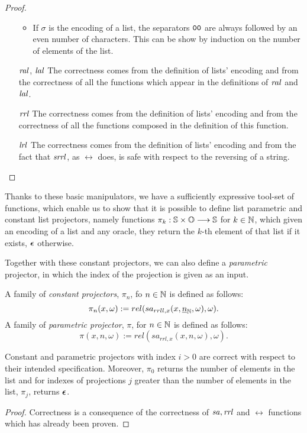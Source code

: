 \begin{proof}
\begin{itemize}
\begin{itemize}
        \item If $\sigma$ is the encoding of a list, the separators
        $\mathtt{0}\mathtt{0}$ are always followed by an even number of characters.
        This can be show by induction on the number of elements of the list.
      \end{itemize}
      \item[$\mathit{ral}$, $\mathit{lal}$] The correctness comes from the definition of
      lists' encoding and from the correctness of all the functions which
      appear in the definitions of $\mathit{ral}$ and $\mathit{lal}$.
      \item[$\mathit{rrl}$] The correctness comes from the definition of
      lists' encoding and from the correctness of all the functions composed
      in the definition of this function.
      \item[$\mathit{lrl}$] The correctness comes from the definition of
      lists' encoding and from the fact that $\mathit{srrl}$, as $\rel$ does, is
      safe with respect to the reversing of a string.
    \end{itemize}
  \end{proof}

  Thanks to these basic manipulators, we have a sufficiently expressive
  tool-set of functions, which enable us to show that it is possible to
  define list parametric and constant list projectors, namely functions
  $\pi_k: \mathbb{S} \times \mathbb{O} \longrightarrow \mathbb{S}$ for $k\in \mathbb{N}$, which given
  an encoding of a list and any oracle, they return the $k$-th element
  of that list if it exists, $\bm{\epsilon}$ otherwise.

  Together with these constant projectors, we can also define a \emph{parametric}
  projector, in which the index of the projection is given as an input.

  \begin{defn}
  A family of \emph{constant projectors}, $\pi_n$,
  fo $n\in \mathbb{N}$ is defined as follows:
  $$
  \pi_n (x,\omega) := rel(sa_{rrll, x}(x,\underline{n}_{\mathbb{N}},\omega),\omega).
  $$
  A family of \emph{parametric projector}, $\pi$,
  for $n\in \mathbb{N}$ is defined as follows:
  $$
  \pi(x,n,\omega) := rel(sa_{rrl,x}(x,n,\omega),\omega).
  $$
  \end{defn}

  \begin{remark}
    \label{rem:pojectors}
  Constant and parametric projectors
  with index $i> 0$ are correct with respect to their
  intended specification.
  Moreover, $\pi_0$ returns the number of elements in
  the list and for indexes of projections $j$ greater
  than the number of elements in the list, $\pi_j$,
  returns $\bm{\epsilon}$.
  \end{remark}
  \begin{proof}
    Correctness is a consequence of the correctness of $\mathit{sa}, \mathit{rrl}$ and
    $\rel$ functions which has already been proven.
  \end{proof}
